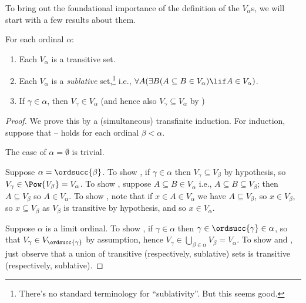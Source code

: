 \documentclass[../../../include/open-logic-section]{subfiles}
\begin{document}

To bring out the foundational importance of the definition of the
$V_\alpha$s, we will start with a few results about them.

\begin{lem}
For each ordinal $\alpha$:
\begin{enumerate}
	\item{} Each $V_\alpha$ is a transitive set.
	\item{} Each $V_\alpha$ is a
	\emph{sublative} set,\footnote{There's no standard terminology for
	``sublativity''. But this seems good.} i.e., $\forall A(\exists
	B(A \subseteq B \in V_\alpha) \lif A \in V_\alpha)$.
	\item{} If $\gamma \in \alpha$, then $V_\gamma
	\in V_\alpha$ (and hence also $V_\gamma \subseteq V_\alpha$ by
	)
\end{enumerate}
\end{lem}

\begin{proof}
We prove this by a (simultaneous) transfinite induction.  For
induction, suppose that -- holds
for each ordinal $\beta < \alpha$. 

The case of $\alpha = \emptyset$ is trivial. 

Suppose $\alpha = \ordsucc{\beta}$. To show , if
$\gamma \in \alpha$ then $V_\gamma \subseteq V_\beta$ by hypothesis,
so $V_\gamma \in \Pow{V_\beta} = V_\alpha$. To show
, suppose $A \subseteq B \in V_\alpha$ i.e., $A
\subseteq B \subseteq V_\beta$; then $A \subseteq V_\beta$ so $A \in
V_\alpha$. To show , note that if $x \in A \in
V_\alpha$ we have $A \subseteq V_\beta$, so $x \in V_\beta$, so $x
\subseteq V_\beta$ as $V_\beta$ is transitive by hypothesis, and so $x
\in V_\alpha$. 

Suppose $\alpha$ is  a limit ordinal. To show , if
$\gamma \in \alpha$ then $\gamma \in \ordsucc{\gamma} \in \alpha$, so
that $V_\gamma \in V_{\ordsucc{\gamma}}$ by assumption, hence
$V_\gamma \in \bigcup_{\beta \in \alpha} V_\beta = V_\alpha$. To show
 and , just observe that a
union of transitive (respectively, sublative) sets is transitive
(respectively, sublative). 
\end{proof}
\end{document}
